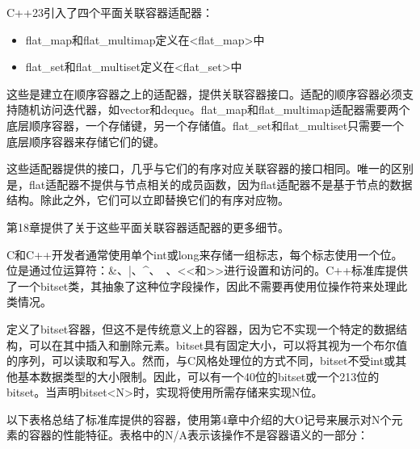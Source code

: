 C++23引入了四个平面关联容器适配器：

\begin{itemize}
\item
flat\_map和flat\_multimap定义在<flat\_map>中

\item
flat\_set和flat\_multiset定义在<flat\_set>中
\end{itemize}

这些是建立在顺序容器之上的适配器，提供关联容器接口。适配的顺序容器必须支持随机访问迭代器，如vector和deque。flat\_map和flat\_multimap适配器需要两个底层顺序容器，一个存储键，另一个存储值。flat\_set和flat\_multiset只需要一个底层顺序容器来存储它们的键。

这些适配器提供的接口，几乎与它们的有序对应关联容器的接口相同。唯一的区别是，flat适配器不提供与节点相关的成员函数，因为flat适配器不是基于节点的数据结构。除此之外，它们可以立即替换它们的有序对应物。

第18章提供了关于这些平面关联容器适配器的更多细节。


C和C++开发者通常使用单个int或long来存储一组标志，每个标志使用一个位。位是通过位运算符：\&、|、\^{}、~、<{}<和>{}>进行设置和访问的。C++标准库提供了一个bitset类，其抽象了这种位字段操作，因此不需要再使用位操作符来处理此类情况。

定义了bitset容器，但这不是传统意义上的容器，因为它不实现一个特定的数据结构，可以在其中插入和删除元素。bitset具有固定大小，可以将其视为一个布尔值的序列，可以读取和写入。然而，与C风格处理位的方式不同，bitset不受int或其他基本数据类型的大小限制。因此，可以有一个40位的bitset或一个213位的bitset。当声明bitset<N>时，实现将使用所需存储来实现N位。


以下表格总结了标准库提供的容器，使用第4章中介绍的大O记号来展示对N个元素的容器的性能特征。表格中的N/A表示该操作不是容器语义的一部分：

